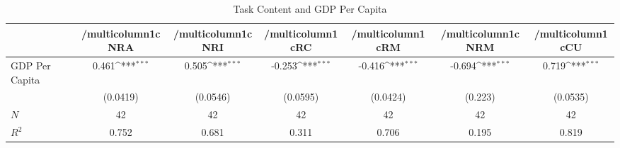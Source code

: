\begin{table}[htbp]\centering
\def\sym#1{\ifmmode^{#1}\else\(^{#1}\)\fi}
\caption{Task Content and GDP Per Capita}
\begin{tabular}{l*{6}{c}}
\hline\hline
            &/multicolumn{1}{c}{NRA}&/multicolumn{1}{c}{NRI}&/multicolumn{1}{c}{RC}&/multicolumn{1}{c}{RM}&/multicolumn{1}{c}{NRM}&/multicolumn{1}{c}{CU}\\
\hline
GDP Per Capita&       0.461\sym{***}&       0.505\sym{***}&      -0.253\sym{***}&      -0.416\sym{***}&      -0.694\sym{***}&       0.719\sym{***}\\
            &    (0.0419)         &    (0.0546)         &    (0.0595)         &    (0.0424)         &     (0.223)         &    (0.0535)         \\
\hline
\(N\)       &          42         &          42         &          42         &          42         &          42         &          42         \\
\(R^{2}\)   &       0.752         &       0.681         &       0.311         &       0.706         &       0.195         &       0.819         \\
\hline\hline
\end{tabular}
\end{table}
